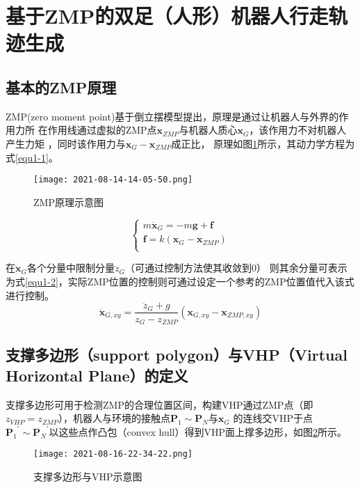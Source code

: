 \section{基于ZMP的双足（人形）机器人行走轨迹生成}
    \subsection{基本的ZMP原理}
        ZMP(zero moment point)基于倒立摆模型提出，原理是通过让机器人与外界的作用力所
        在作用线通过虚拟的ZMP点$\boldsymbol{x}_{ZMP}$与机器人质心$\boldsymbol{x}_G$，该作用力不对机器人产生力矩
        ，同时该作用力与$\boldsymbol{x}_{G}-\boldsymbol{x}_{ZMP}$成正比\cite{sugiharaRealtimeHumanoidMotion2002}，
        原理如图\ref{fig1-1}所示，其动力学方程为式\eqref{equ1-1}。
        \begin{figure}[h] %
            \centering
            \texttt{[image: 2021-08-14-14-05-50.png]}
            \caption{ZMP原理示意图} \label{fig1-1}
        \end{figure}
        \begin{equation}
            \begin{cases}
            m\boldsymbol{\ddot{x}}_G=-m\boldsymbol{g}+\boldsymbol{f}\\
            \boldsymbol{f}=k\left( \boldsymbol{x}_G-\boldsymbol{x}_{ZMP} \right)\\
            \end{cases} \label{equ1-1}
        \end{equation}

        在$\boldsymbol{\ddot{x}}_G$各个分量中限制分量$\ddot{z}_G$（可通过控制方法使其收敛到0）
        则其余分量可表示为式\eqref{equ1-2}，实际ZMP位置的控制则可通过设定一个参考的ZMP位置值代入该式进行控制。
        \begin{equation}
            \boldsymbol{\ddot{x}}_{G,xy}=\frac{\ddot{z}_G+g}{z_G-z_{ZMP}}\left( \boldsymbol{x}_{G,xy}-\boldsymbol{x}_{ZMP,xy} \right) 
            \label{equ1-2}
        \end{equation}
    \subsection{支撑多边形（support polygon）与VHP（Virtual Horizontal Plane）的定义}
        支撑多边形可用于检测ZMP的合理位置区间，构建VHP通过ZMP点（即$z_{VHP}=z_{ZMP}$），机器人与环境的接触点${\boldsymbol{P}_1}\sim{\boldsymbol{P}_N}$与$\boldsymbol{x}_G$
        的连线交VHP于点${\boldsymbol{P}_1}^{'}\sim{\boldsymbol{P}_N}^{'}$以这些点作凸包（convex hull）得到VHP面上撑多边形，如图\ref{fig1-2}所示。
        \begin{figure}[h] %
            \centering
            \texttt{[image: 2021-08-16-22-34-22.png]}
            \caption{支撑多边形与VHP示意图} \label{fig1-2}
        \end{figure}
        